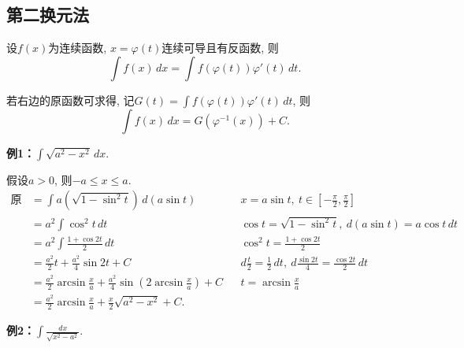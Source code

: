 \documentclass[a4paper,punct=CCT]{ctexbook}
\newcommand*{\mreason}[1]{#1}
\newcommand*{\ex}[2]{\textbf{例#1：}#2}
\newcommand*{\disp}[1]{\( \displaystyle #1 \)}
\newcommand*{\exds}[2]{\ex{#1}\disp{#2}}
\theoremstyle{definition}
\theoremstyle{remark}
\let\leq\leqslant
\let\le\leq
\begin{document}
\subsection{第二换元法\label{6.2.2}}

设$ f(x) $为连续函数, $ x = \varphi(t) $连续可导且有反函数, 则
\[ \int f(x) \, dx = \int f(\varphi(t)) \varphi'(t) \, dt. \]

若右边的原函数可求得, 记\disp{ G(t) = \int f(\varphi(t)) \varphi'(t) \, dt }, 则
\[ \int f(x) \, dx = G(\varphi^{-1}(x)) + C. \]

\hypertarget{eg:sinsub}{}
\exds{1}{ \int \sqrt{a^2 - x^2} \, dx. }

假设$ a > 0 $, 则$ -a \le x \le a$.
\begin{align*}
  \text{原式}
  &= \int a(\sqrt{1-\sin^2 t}) \, d(a\sin t)
  && \mreason{x = a \sin t, \  t \in [-\frac{\pi}{2}, \frac{\pi}{2}] } \\
  &= a^2 \int \cos^2 t \, dt
  && \mreason{ \cos t = \sqrt{1-\sin^2 t},\ d(a\sin t) = a\cos t \, dt } \\
  &= a^2 \int \frac{1+\cos 2t}{2} \, dt
  && \mreason{ \cos^2 t = \frac{1+\cos 2t}{2} } \\
  &= \frac{a^2}{2} t + \frac{a^2}{4} \sin 2t + C
  && \mreason{ d\frac{t}{2} = \frac{1}{2} \, dt,\ d\frac{\sin 2t}{4} = \frac{\cos 2t}{2} \, dt } \\
  &= \frac{a^2}{2} \arcsin \frac{x}{a} + \frac{a^2}{4} \sin(2\arcsin\frac{x}{a}) + C
  && \mreason{ t = \arcsin\frac{x}{a} } \\
  &= \frac{a^2}{2} \arcsin \frac{x}{a} + \frac{x}{2} \sqrt{a^2 - x^2} + C.
\end{align*}

\exds{2}{ \int \frac{dx}{\sqrt{x^2 - a^2}}. }
\end{document}
